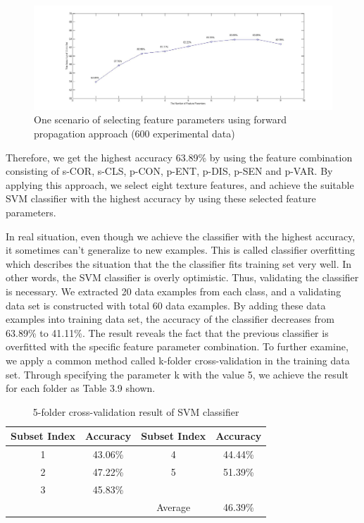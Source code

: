 \begin{figure}[!h]
\includegraphics[width=\linewidth]{fig3_6}
\caption{One scenario of selecting feature parameters using forward propagation approach (600 experimental data)}
\end{figure}
Therefore, we get the highest accuracy 63.89\% by using the feature combination consisting of s-COR, s-CLS, p-CON, p-ENT, p-DIS, p-SEN and p-VAR. By applying this approach, we select eight texture features, and achieve the suitable SVM classifier with the highest accuracy by using these selected feature parameters.\par
In real situation, even though we achieve the classifier with the highest accuracy, it sometimes can't generalize to new examples. This is called classifier overfitting which describes the situation that the the classifier fits training set very well. In other words, the SVM classifier is overly optimistic. Thus, validating the classifier is necessary. We extracted 20 data examples from each class, and a validating data set is constructed with total 60 data examples. By adding these data examples into training data set, the accuracy of the classifier decreases from 63.89\% to 41.11\%. The result reveals the fact that the previous classifier is overfitted with the specific feature parameter combination. To further examine, we apply a common method called k-folder cross-validation in the training data set. Through specifying the parameter k with the value 5, we achieve the result for each folder as Table 3.9 shown.  
\begin{table}[!h]
\begin{center}
\begin{tabular}{||c c | c c ||}
\hline
Subset Index & Accuracy & Subset Index & Accuracy \\[0.7ex]
\hline\hline
1 & 43.06\% & 4 & 44.44\% \\
2 & 47.22\% & 5 & 51.39\% \\
3 & 45.83\% &  &  \\
\hline
 & & Average & 46.39\% \\
\hline
\end{tabular}
\caption {5-folder cross-validation result of SVM classifier}
\end{center}
\end{table}
